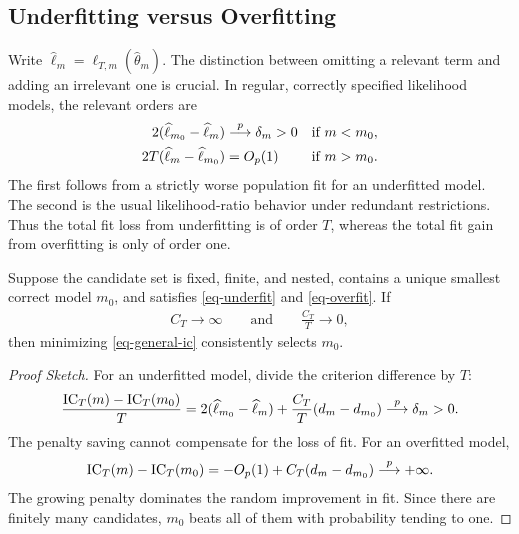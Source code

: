 \documentclass[a4paper,12pt]{article}
\begin{document}
\subsection{Underfitting versus Overfitting}

Write $\widehat\ell_m=\ell_{T,m}(\widehat\theta_m)$.
The distinction between omitting a relevant term and adding an irrelevant one is crucial.
In regular, correctly specified likelihood models, the relevant orders are
\begin{align}
    2(\widehat\ell_{m_0}-\widehat\ell_m)&\overset{p}{\longrightarrow}\delta_m>0
    &&\text{if }m<m_0,\label{eq-underfit}\\
    2T(\widehat\ell_m-\widehat\ell_{m_0})&=O_p(1)
    &&\text{if }m>m_0.\label{eq-overfit}
\end{align}
The first follows from a strictly worse population fit for an underfitted model.
The second is the usual likelihood-ratio behavior under redundant restrictions.
Thus the total fit loss from underfitting is of order $T$,
whereas the total fit gain from overfitting is only of order one.

\begin{theorem}\label{thm-selection}
    Suppose the candidate set is fixed, finite, and nested, contains a unique smallest
    correct model $m_0$, and satisfies \eqref{eq-underfit} and \eqref{eq-overfit}.
    If
    \begin{align}\label{eq-penalty-rates}
        C_T\to\infty
        \qquad\text{and}\qquad
        \frac{C_T}{T}\to0,
    \end{align}
    then minimizing \eqref{eq-general-ic} consistently selects $m_0$.
\end{theorem}
\begin{proof}[Proof Sketch]
    For an underfitted model, divide the criterion difference by $T$:
    \begin{align*}
        \frac{\mathrm{IC}_T(m)-\mathrm{IC}_T(m_0)}{T}
        =2(\widehat\ell_{m_0}-\widehat\ell_m)
        +\frac{C_T}{T}(d_m-d_{m_0})
        \overset{p}{\longrightarrow}\delta_m>0.
    \end{align*}
    The penalty saving cannot compensate for the loss of fit.
    For an overfitted model,
    \begin{align*}
        \mathrm{IC}_T(m)-\mathrm{IC}_T(m_0)
        =-O_p(1)+C_T(d_m-d_{m_0})\overset{p}{\longrightarrow}+\infty.
    \end{align*}
    The growing penalty dominates the random improvement in fit.
    Since there are finitely many candidates, $m_0$ beats all of them with probability tending to one.
\end{proof}
\end{document}
